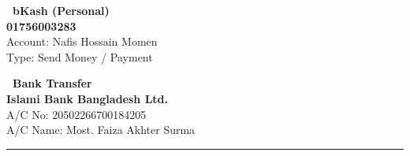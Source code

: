 \documentclass[a4paper,11pt]{article}
\newcommand{\invoiceline}{\noindent\textcolor{borderGray}{\rule{\textwidth}{0.5pt}}\vspace{4pt}}
\begin{document}
\noindent
\begin{minipage}[t]{0.48\textwidth}
    \colorbox{brandLight}{%
        \parbox{\dimexpr\linewidth-2\fboxsep}{%
            \vspace{6pt}
            {\color{brandPurple}\bfseries \faMobile\ bKash (Personal)}\\[4pt]
            {\large\bfseries 01756003283}\\[3pt]
            {\small\color{textGray}Account: Nafis Hossain Momen}\\[2pt]
            {\small\color{textGray}Type: Send Money / Payment}
            \vspace{6pt}
        }%
    }
\end{minipage}%
\hfill
\begin{minipage}[t]{0.48\textwidth}
    \colorbox{brandLight}{%
        \parbox{\dimexpr\linewidth-2\fboxsep}{%
            \vspace{6pt}
            {\color{brandPurple}\bfseries \faUniversity\ Bank Transfer}\\[4pt]
            {\large\bfseries Islami Bank Bangladesh Ltd.}\\[3pt]
            {\small\color{textGray}A/C No: 20502266700184205}\\[2pt]
            {\small\color{textGray}A/C Name: Most. Faiza Akhter Surma}
            \vspace{6pt}
        }%
    }
\end{minipage}

\vspace{0.6cm}
\invoiceline


\vspace{0.2cm}

\vspace{0.3cm}
\end{document}
